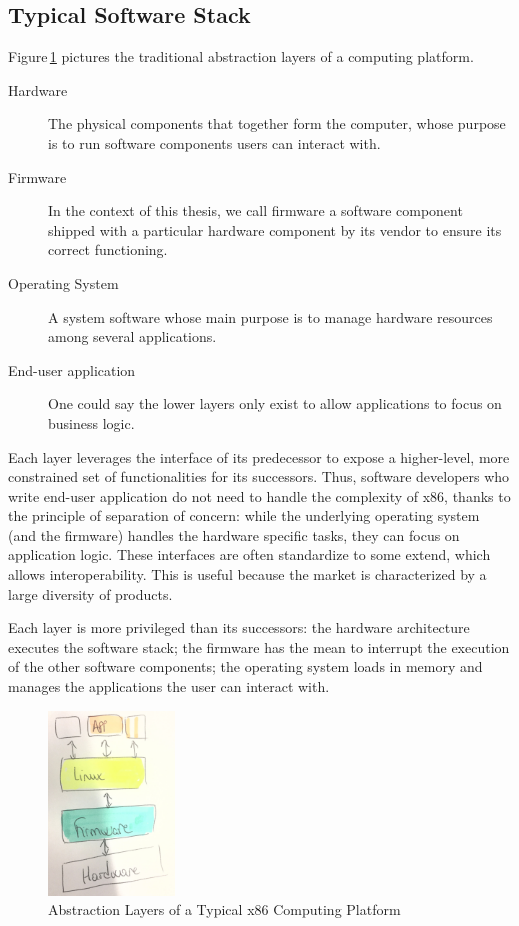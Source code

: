\subsection{Typical Software Stack}

Figure\,\ref{fig:usecase:computing-platform-1} pictures the traditional
abstraction layers of a computing platform.

\begin{description}
\item [Hardware] The physical components that together form the computer, whose
  purpose is to run software components users can interact with.
%
\item [Firmware] In the context of this thesis, we call firmware a software
  component shipped with a particular hardware component by its vendor to ensure
  its correct functioning.
%
\item [Operating System] A system software whose main purpose is to manage
  hardware resources among several applications.
%
\item [End-user application] One could say the lower layers only exist to allow
  applications to focus on business logic.
\end{description}

Each layer leverages the interface of its predecessor to expose a higher-level,
more constrained set of functionalities for its successors.
%
Thus, software developers who write end-user application do not need to handle
the complexity of x86, thanks to the principle of separation of concern: while
the underlying operating system (and the firmware) handles the hardware specific
tasks, they can focus on application logic.
%
These interfaces are often standardize to some extend, which allows
interoperability.
%
This is useful because the market is characterized by a large diversity of
products.
%

Each layer is more privileged than its successors:
%
the hardware architecture executes the software stack;
%
the firmware has the mean to interrupt the execution of the other software
components;
%
the operating system loads in memory and manages the applications the user can
interact with.

\begin{figure}
  \centering
  \includegraphics[width=0.3\textwidth]{Figures/computing-platform-1.jpg}
  \caption{Abstraction Layers of a Typical x86 Computing Platform}
  \label{fig:usecase:computing-platform-1}
\end{figure}

